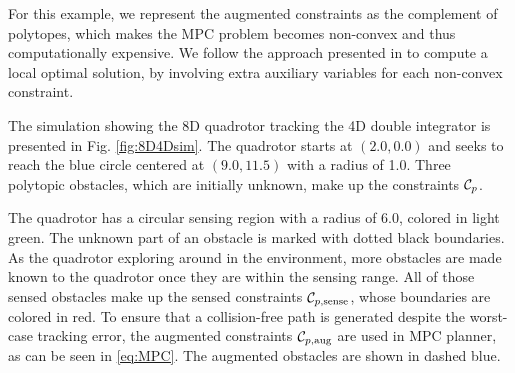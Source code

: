 %
%
For this example, we represent the augmented constraints as the complement of polytopes, which makes the MPC problem becomes non-convex and thus computationally expensive. 
We follow the approach presented in \cite{Zhang2017} to compute a local optimal solution, by involving extra auxiliary variables for each non-convex constraint. 
%
%
%

The simulation showing the 8D quadrotor tracking the 4D double integrator is presented in Fig. \ref{fig:8D4Dsim}. The quadrotor starts at $(2.0,0.0)$ and seeks to reach the blue circle centered at $(9.0,11.5)$ with a radius of 1.0. Three polytopic obstacles, which are initially unknown, make up the constraints $\mathcal C_p$. 

The quadrotor has a circular sensing region with a radius of 6.0, colored in light green. The unknown part of an obstacle is marked with dotted black boundaries. As the quadrotor exploring around in the environment, more obstacles are made known to the quadrotor once they are within the sensing range. All of those sensed obstacles make up the sensed constraints $\mathcal C_{p,\text{sense}}$, whose boundaries are colored in red. To ensure that a collision-free path is generated despite the worst-case tracking error, the augmented constraints $\mathcal C_{p,\text{aug}}$ are used in MPC planner, as can be seen in \eqref{eq:MPC}. The augmented obstacles are shown in dashed blue.

